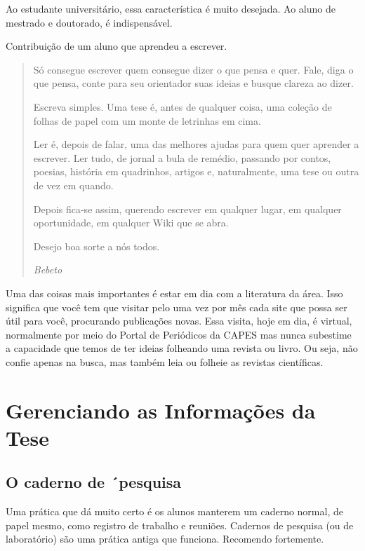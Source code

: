 Ao estudante universitário, essa característica é muito desejada. Ao aluno de mestrado e doutorado, é indispensável.


Contribuição de um aluno que aprendeu a escrever.

\begin{quote}

Só consegue escrever quem consegue dizer o que pensa e quer.  Fale, diga o que pensa, conte para seu orientador suas ideias e busque clareza ao dizer.

Escreva simples.  Uma tese é, antes de qualquer coisa, uma coleção de folhas de papel com um monte de letrinhas em cima.  

Ler é, depois de falar, uma das melhores ajudas para quem quer aprender a escrever.  Ler tudo, de jornal a bula de remédio, passando por contos, poesias, história em quadrinhos, artigos e, naturalmente, uma tese ou outra de vez em quando.

Depois fica-se assim, querendo escrever em qualquer lugar, em qualquer oportunidade, em qualquer Wiki que se abra.

Desejo boa sorte a nós todos.

\textit{Bebeto}

\end{quote}

Uma das coisas mais importantes é estar em dia com a literatura da área. Isso significa que você tem que visitar pelo uma vez por mês cada site que possa ser útil para você, procurando publicações novas. Essa visita, hoje em dia, é virtual, normalmente por meio do Portal de Periódicos da CAPES mas nunca subestime a capacidade que temos de ter ideias folheando uma revista ou livro. 
Ou seja, não confie apenas na busca, mas também leia ou folheie as revistas científicas.


\section{Gerenciando as Informações da Tese}

\subsection{O caderno de ´pesquisa}

Uma prática que dá muito certo é os alunos manterem um caderno normal, de papel mesmo, como registro de trabalho e reuniões.
Cadernos de pesquisa (ou de laboratório) são uma prática antiga que funciona. Recomendo fortemente.


